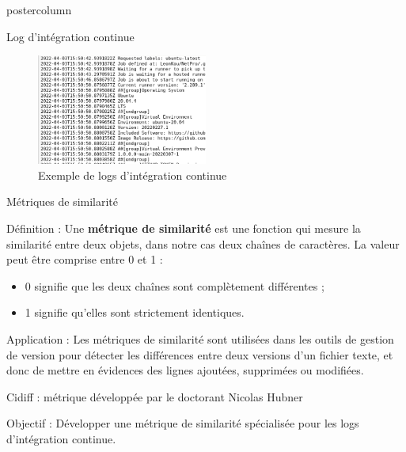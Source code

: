 \begin{frame}
\begin{columns}
\begin{column}{.49\textwidth}
\begin{beamercolorbox}[center,wd=\textwidth]{postercolumn}
\begin{minipage}[T]{.95\textwidth}
{\begin{block}{Log d'intégration continue}
            \begin{figure}[h!]
              \centering
              \includegraphics[width=0.5\textwidth]{sample/example_log.png}
              \caption{Exemple de logs d'intégration continue}
              \label{fig:example_log}
          \end{figure}

            \end{block}

            
            \vfill
            
            \begin{block}{Métriques de similarité}
            
            Définition : Une \textbf{métrique de similarité} est une fonction qui mesure la similarité entre deux objets, dans notre cas deux chaînes de caractères.	La valeur peut être comprise entre 0 et 1 :
            \begin{itemize}
              \item 0 signifie que les deux chaînes sont complètement différentes ;
              \item 1 signifie qu'elles sont strictement identiques.
            \end{itemize}

            Application : Les métriques de similarité sont utilisées dans les outils de gestion de version pour détecter les différences entre deux versions d'un fichier texte, et donc de mettre en évidences des lignes ajoutées, supprimées ou modifiées.
            
            \end{block}
            
            \vfill
            
            \begin{block}{Cidiff : métrique développée par le doctorant Nicolas Hubner}
            
            Objectif : Développer une métrique de similarité spécialisée pour les logs d'intégration continue.
            

\end{block}}
\end{minipage}
\end{beamercolorbox}
\end{column}
\end{columns}
\end{frame}
